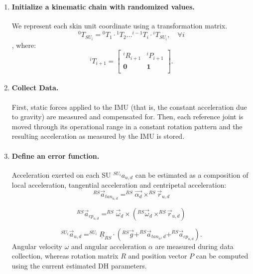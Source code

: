 \begin{enumerate}
    \item \paragraph{Initialize a kinematic chain with randomized values.}
    We represent each skin unit coordinate using a transformation matrix.
    $${}^0T_{SU_i} = {}^0T_1 \cdot {}^1T_2 \dots {}^{i-1}T_i \cdot {}^i T_{SU_i}, \quad \forall i$$
    , where:
    $$
    {}^{i}T_{i+1} =
        \left[ \begin{array}{c|c}
            {}^{i}R_{i+1} & {}^{i}P_{i+1} \\
            \hline
            \mathbf{0} & \mathbf{1} \\
        \end{array}\right].
    $$

    \item \paragraph{Collect Data.}
    First, static forces applied to the IMU (that is, the constant acceleration due to gravity)
    are measured and compensated for.
    Then, each reference joint is moved through its operational range in a constant rotation pattern
    and the resulting acceleration as measured by the IMU is stored.

    \item \paragraph{Define an error function.}
    Acceleration exerted on each SU ${}^{SU_i}a_{u,d}$ can be estimated as a composition of local acceleration,
    tangential acceleration and centripetal acceleration:
    $$^{RS}\vec{a}_{t a n_{u, d}} = ^{R S} \overrightarrow{\alpha_{d}} \times^{R S} \vec{r}_{u, d}$$

    $$^{RS}\vec{a}_{cp_{u, d}} = ^{R S} \vec{\omega}_{d} \times\left(^{R S} \vec{\omega}_{d} \times^{R S} \vec{r}_{u, d}\right)$$

    $$^{SU_{i}}\vec{a}_{u, d} = ^{SU_{i}}\underline{R}_{R S} \cdot\left(^{R S} \vec{g}+^{R S} \vec{a}_{t a n_{u}, d}+^{R S} \vec{a}_{c p_{u, d}}\right).$$
    Angular velocity $\omega$ and angular acceleration $\alpha$ are measured during data collection, whereas rotation matrix $R$ and position vector $P$ can be computed using the current estimated DH parameters.


\end{enumerate}
